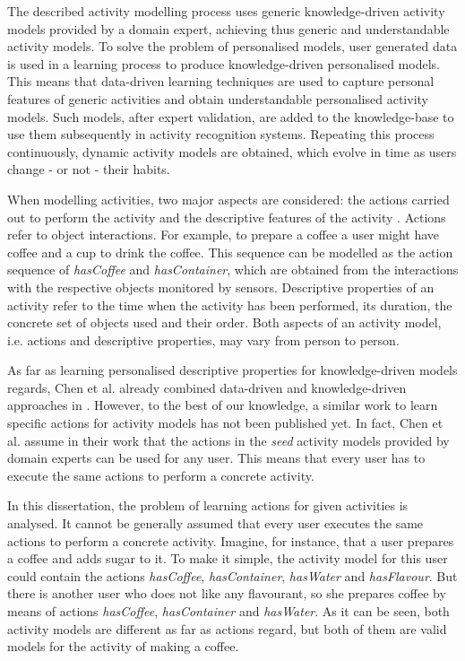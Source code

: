 The described activity modelling process uses generic knowledge-driven activity models provided by a domain expert, achieving thus generic and understandable activity models. To solve the problem of personalised models, user generated data is used in a learning process to produce knowledge-driven personalised models. This means that data-driven learning techniques are used to capture personal features of generic activities and obtain understandable personalised activity models. Such models, after expert validation, are added to the knowledge-base to use them subsequently in activity recognition systems. Repeating this process continuously, dynamic activity models are obtained, which evolve in time as users change - or not - their habits.


When modelling activities, two major aspects are considered: the actions carried out to perform the activity and the descriptive features of the activity \cite{Chen2014}. Actions refer to object interactions. For example, to prepare a coffee a user might have coffee and a cup to drink the coffee. This sequence can be modelled as the action sequence of \textit{hasCoffee} and \textit{hasContainer}, which are obtained from the interactions with the respective objects monitored by sensors. Descriptive properties of an activity refer to the time when the activity has been performed, its duration, the concrete set of objects used and their order. Both aspects of an activity model, i.e. actions and descriptive properties, may vary from person to person. 

As far as learning personalised descriptive properties for knowledge-driven models regards, Chen et al. already combined data-driven and knowledge-driven approaches in \cite{Chen2014}. However, to the best of our knowledge, a similar work to learn specific actions for activity models has not been published yet. In fact, Chen et al. assume in their work that the actions in the \textit{seed} activity models provided by domain experts can be used for any user. This means that every user has to execute the same actions to perform a concrete activity.

In this dissertation, the problem of learning actions for given activities is analysed. It cannot be generally assumed that every user executes the same actions to perform a concrete activity. Imagine, for instance, that a user prepares a coffee and adds sugar to it. To make it simple, the activity model for this user could contain the actions \textit{hasCoffee}, \textit{hasContainer}, \textit{hasWater} and \textit{hasFlavour}. But there is another user who does not like any flavourant, so she prepares coffee by means of actions \textit{hasCoffee}, \textit{hasContainer} and  \textit{hasWater}. As it can be seen, both activity models are different as far as actions regard, but both of them are valid models for the activity of making a coffee. 

